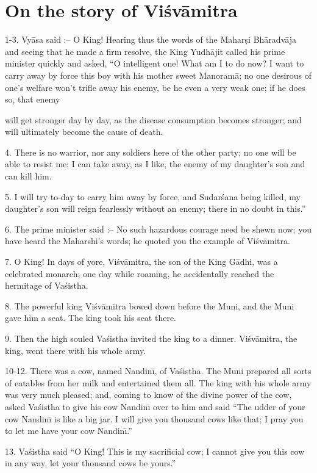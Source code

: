 \chapter{On the story of Vi\'sv\=amitra}

1-3. Vy\=asa said :-- O King! Hearing thus the words of the Mahar\d{s}i Bh\=aradv\=aja and seeing that he made a firm resolve, the King Yudh\=ajit called his prime minister quickly and asked, ``O intelligent one! What am I to do now? I want to carry away by force this boy with his mother sweet Manoram\=a; no one desirous of one's welfare won't trifle away his enemy, be he even a very weak one; if he does so, that enemy

will get stronger day by day, as the disease consumption becomes stronger; and will ultimately become the cause of death.

4. There is no warrior, nor any soldiers here of the other party; no one will be able to resist me; I can take away, as I like, the enemy of my daughter's son and can kill him.

5. I will try to-day to carry him away by force, and Sudar\'sana being killed, my daughter's son will reign fearlessly without an enemy; there in no doubt in this.''

6. The prime minister said :-- No such hazardous courage need be shewn now; you have heard the Maharshi's words; he quoted you the example of Vi\'sv\=amitra.

7. O King! In days of yore, Vi\'sv\=amitra, the son of the King G\=adhi, was a celebrated monarch; one day while roaming, he accidentally reached the hermitage of Va\'sistha.

8. The powerful king Vi\'sv\=amitra bowed down before the Muni, and the Muni gave him a seat. The king took his seat there.

9. Then the high souled Va\'sistha invited the king to a dinner. Vi\'sv\=amitra, the king, went there with his whole army.

10-12. There was a cow, named Nandin\={\i}, of Va\'sistha. The Muni prepared all sorts of eatables from her milk and entertained them all. The king with his whole army was very much pleased; and, coming to know of the divine power of the cow, asked Va\'sistha to give his cow Nandin\={\i} over to him and said ``The udder of your cow Nandin\={\i} is like a big jar. I will give you thousand cows like that; I pray you to let me have your cow Nandin\={\i}.''

13. Va\'sistha said ``O King! This is my sacrificial cow; I cannot give you this cow in any way, let your thousand cows be yours.''

